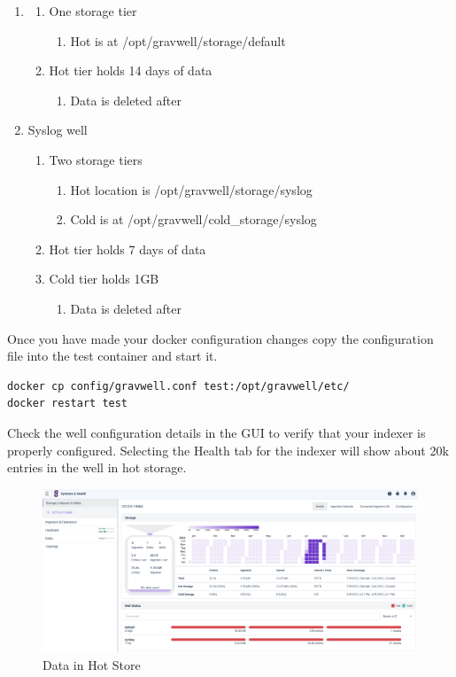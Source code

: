 {{\begin{enumerate}
	\item {}
	\begin{enumerate}
		\item{One storage tier}
		\begin{enumerate}
			\item Hot is at /opt/gravwell/storage/default
		\end{enumerate}
		\item Hot tier holds 14 days of data
		\begin{enumerate}
			\item Data is deleted after
		\end{enumerate}
	\end{enumerate}
	\item Syslog well
	\begin{enumerate}
		\item Two storage tiers
		\begin{enumerate}
			\item Hot location is /opt/gravwell/storage/syslog
			\item Cold is at /opt/gravwell/cold\_storage/syslog
		\end{enumerate}
		\item Hot tier holds 7 days of data
		\item Cold tier holds 1GB
		\begin{enumerate}
			\item Data is deleted after
		\end{enumerate}
	\end{enumerate}
\end{enumerate}

Once you have made your docker configuration changes copy the
configuration file into the test container and start it.

\begin{Verbatim}[breaklines=true]
docker cp config/gravwell.conf test:/opt/gravwell/etc/
docker restart test
\end{Verbatim}

\clearpage
Check the well configuration details in the GUI to verify that your
indexer is properly configured. Selecting the Health tab for the indexer
will show about 20k entries in the  well in hot storage.

\begin{figure}
	\includegraphics{images/hotstore.png}
	\caption{Data in Hot Store}
\end{figure}

}}
